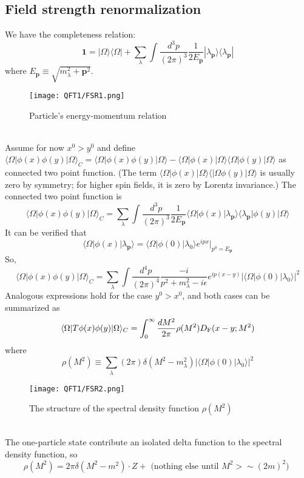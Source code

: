 \subsection{Field strength renormalization}
\noindent
We have the completeness relation:
\[\bm{1} = |\Omega\rangle\langle\Omega| +  \sum_{\lambda} \int \frac{d^3p}{(2\pi)^3} \frac{1}{2E_{\bm{p}}} |\lambda_{\bm{p}}\rangle\langle\lambda_{\bm{p}}|\]
where $E_{\bm{p}} \equiv \sqrt{m_{\lambda}^2 + \bm{p}^2}$.
\\
\begin{figure}[!h]
\centering
\texttt{[image: QFT1/FSR1.png]}
\caption{Particle's energy-momentum relation}
\end{figure}
\\
Assume for now $x^0 > y^0$ and define $\langle \Omega | \phi(x) \phi(y) | \Omega \rangle_{C} = \langle \Omega | \phi(x) \phi(y) | \Omega \rangle - \langle \Omega | \phi(x)| \Omega \rangle \langle \Omega | \phi(y) | \Omega \rangle$ as connected two point function. (The term $\langle \Omega | \phi(x)| \Omega \rangle \langle | \Omega \phi(y) | \Omega \rangle$ is usually zero by symmetry; for higher spin fields, it is zero by Lorentz invariance.) The connected two point function is
\[\langle \Omega | \phi(x) \phi(y) | \Omega \rangle_{C} = \sum_{\lambda} \int \frac{d^3p}{(2\pi)^3} \frac{1}{2E_{\bm{p}}} \langle \Omega | \phi(x) |\lambda_{\bm{p}}\rangle\langle\lambda_{\bm{p}}| \phi(y) | \Omega \rangle\]
It can be verified that
\[\langle \Omega | \phi(x) |\lambda_{\bm{p}}\rangle = \langle \Omega | \phi(0) | \lambda_0 \rangle e^{ipx} |_{p^0 = E_{\bm{p}}}\]
So,
\[\langle \Omega | \phi(x) \phi(y) | \Omega \rangle_C = \sum_{\lambda} \int \frac{d^4p}{(2\pi)^4} \frac{-i}{p^2 + m_{\lambda}^2 -i\epsilon} e^{ip(x-y)} |\langle \Omega | \phi(0) | \lambda_0 \rangle|^2\]
Analogous expressions hold for the case $y^0 > x^0$, and both cases can be summarized as
\[\langle \Omega | T \phi(x) \phi(y) | \Omega \rangle_C = \int_0^{\infty} \frac{dM^2}{2\pi} \rho(M^2) D_{\rm F}(x-y;M^2)\]
where 
\[\rho(M^2) \equiv \sum_{\lambda} (2\pi) \delta(M^2-m_{\lambda}^2)|\langle \Omega | \phi(0) | \lambda_0 \rangle|^2 \]
\begin{figure}[!h]
\centering
\texttt{[image: QFT1/FSR2.png]}
\caption{The structure of the spectral density function $\rho(M^2)$}
\end{figure}
\\
The one-particle state contribute an isolated delta function to the spectral density function, so
\[\rho(M^2) = 2\pi \delta (M^2 -m^2) \cdot Z + \mbox{ (nothing else until $M^2 > \sim (2m)^2$) }\]
